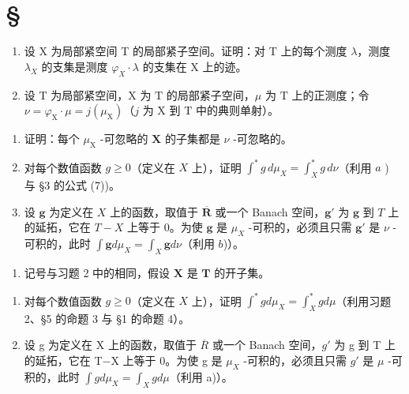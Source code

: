 \section*{\texorpdfstring{\S\CurrentExerciseGroup}{第{\CurrentExerciseGroup}节}}
{}

\begin{enumerate}
\def\labelenumi{\arabic{enumi})}
\item
  设 X 为局部紧空间 T 的局部紧子空间。证明：对 T 上的每个测度 \(\lambda\)，测度 \(\lambda_{X}\) 的支集是测度 \(\varphi_{X} \cdot \lambda\) 的支集在 X 上的迹。
\item
  设 \(\mathrm{T}\) 为局部紧空间，\(\mathrm{X}\) 为 \(\mathrm{T}\) 的局部紧子空间，\(\mu\) 为 \(\mathrm{T}\) 上的正测度；令 \(\nu = \varphi_{\mathrm{X}} \cdot \mu = j(\mu_{\mathrm{X}})\)（\(j\) 为 \(\mathrm{X}\) 到 \(\mathrm{T}\) 中的典则单射）。
\end{enumerate}

\begin{enumerate}
\def\labelenumi{\alph{enumi})}
\item
  证明：每个 \(\mu_{\mathrm{X}}\) -可忽略的 \(\mathbf{X}\) 的子集都是 \(\nu\) -可忽略的。
\item
  对每个数值函数 \(g \geqslant 0\)（定义在 \(X\) 上），证明 \(\int^{*} g \, d\mu_{X} = \int_{X}^{*} g \, d\nu\)（利用 \(a\) ) 与 §3 的公式 (7))。
\item
  设 \(\mathbf{g}\) 为定义在 \(X\) 上的函数，取值于 \(\overline{\mathbf{R}}\) 或一个 Banach 空间，\(\mathbf{g}'\) 为 \(\mathbf{g}\) 到 \(T\) 上的延拓，它在 \(T - X\) 上等于 0。为使 \(\mathbf{g}\) 是 \(\mu_{X}\) -可积的，必须且只需 \(\mathbf{g}'\) 是 \(\nu\) -可积的，此时 \(\int \mathbf{g} d\mu_X = \int_X \mathbf{g} d\nu\)（利用 \(b\))）。
\end{enumerate}

\begin{enumerate}
\def\labelenumi{\arabic{enumi})}
\setcounter{enumi}{2}
\tightlist
\item
  记号与习题 2 中的相同，假设 \(\mathbf{X}\) 是 \(\mathbf{T}\) 的开子集。
\end{enumerate}

\begin{enumerate}
\def\labelenumi{\alph{enumi})}
\item
  对每个数值函数 \(g \geqslant 0\)（定义在 \(X\) 上），证明 \(\int^{*} g d\mu_{X} = \int_{X}^{*} g d\mu\)（利用习题 2、§5 的命题 3 与 §1 的命题 4）。
\item
  设 g 为定义在 X 上的函数，取值于 \(\overline{R}\) 或一个 Banach 空间，\(g'\) 为 g 到 T 上的延拓，它在 T−X 上等于 0。为使 g 是 \(\mu_{X}\) -可积的，必须且只需 \(g'\) 是 \(\mu\) -可积的，此时 \(\int g d\mu_{X} = \int_{X} g d\mu\)（利用 a)）。
\end{enumerate}

